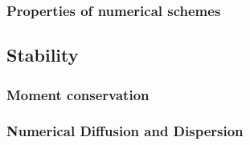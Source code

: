 \subsubsection{Properties of numerical schemes}
\subsection{Stability}
\subsubsection{Moment conservation}
\subsubsection{Numerical Diffusion and Dispersion}
